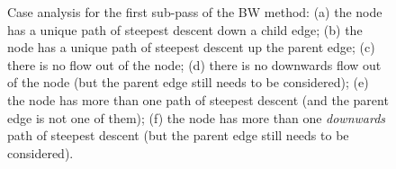 \documentclass[preprint,a4paper]{elsarticle}
\newenvironment{stusubfig}[1]
{
	\begin{figure}[#1]
	\begin{center}
}
{
	\end{center}
	\end{figure}
}
\begin{document}
\begin{stusubfig}{!t}
	\hspace{4mm}%
\caption{Case analysis for the first sub-pass of the BW method: (a) the node has a unique path of steepest descent down a child edge; (b) the node has a unique path of steepest descent up the parent edge; (c) there is no flow out of the node; (d) there is no downwards flow out of the node (but the parent edge still needs to be considered); (e) the node has more than one path of steepest descent (and the parent edge is not one of them); (f) the node has more than one \emph{downwards} path of steepest descent (but the parent edge still needs to be considered).}
\label{fig:segmentation-waterfall-smg-pass1cases}
\end{stusubfig}
\end{document}
